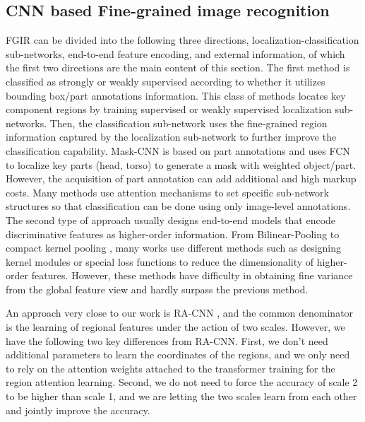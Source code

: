 \documentclass[sigconf]{acmart}
\begin{document}
\subsection{CNN based Fine-grained image recognition}
FGIR can be divided into the following three directions, localization-classification sub-networks, end-to-end feature encoding, and external information, of which the first two directions are the main content of this section. The first method is classified as strongly \cite{Pose, Mask-CNN, HSnet} or weakly supervised \cite{StackedLSTM} according to whether it utilizes bounding box/part annotations information. This class of methods locates key component regions by training supervised or weakly supervised localization sub-networks. Then, the classification sub-network uses the fine-grained region information captured by the localization sub-network to further improve the classification capability. Mask-CNN \cite{Mask-CNN} is based on part annotations and uses FCN to localize key parts (head, torso) to generate a mask with weighted object/part. However, the acquisition of part annotation can add additional and high markup costs. Many methods use attention mechanisms to set specific sub-network structures so that classification can be done using only image-level annotations. The second type of approach usually designs end-to-end models that encode discriminative features as higher-order information. From Bilinear-Pooling \cite{Bilinear-CNN} to compact kernel pooling \cite{Compact}, many works use different methods such as designing kernel modules \cite{Kernel_Pooling} or special loss functions \cite{DBTNet} to reduce the dimensionality of higher-order features. However, these methods have difficulty in obtaining fine variance from the global feature view and hardly surpass the previous method.

An approach very close to our work is RA-CNN \cite{RA-CNN}, and the common denominator is the learning of regional features under the action of two scales. However, we have the following two key differences from RA-CNN. First, we don't need additional parameters to learn the coordinates of the regions, and we only need to rely on the attention weights attached to the transformer training for the region attention learning. Second, we do not need to force the accuracy of scale 2 to be higher than scale 1, and we are letting the two scales learn from each other and jointly improve the accuracy.
\end{document}
